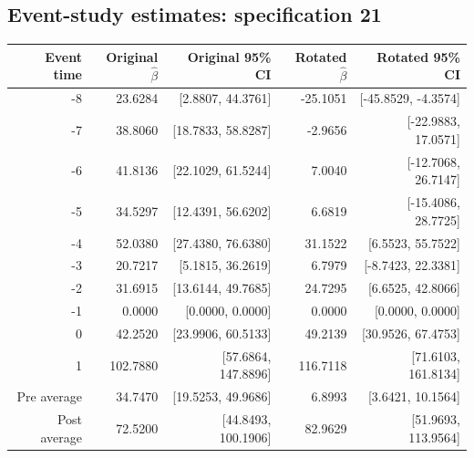 \documentclass[10pt]{article}
\begin{document}
\subsection*{Event-study estimates: specification 21}
\begin{center}\scriptsize
\begin{tabular}{r rr rr}
\toprule
Event time & Original $\hat\beta$ & Original 95\% CI & Rotated $\hat\beta$ & Rotated 95\% CI \\
\midrule
-8 & 23.6284 & [2.8807, 44.3761] & -25.1051 & [-45.8529, -4.3574] \\
-7 & 38.8060 & [18.7833, 58.8287] & -2.9656 & [-22.9883, 17.0571] \\
-6 & 41.8136 & [22.1029, 61.5244] & 7.0040 & [-12.7068, 26.7147] \\
-5 & 34.5297 & [12.4391, 56.6202] & 6.6819 & [-15.4086, 28.7725] \\
-4 & 52.0380 & [27.4380, 76.6380] & 31.1522 & [6.5523, 55.7522] \\
-3 & 20.7217 & [5.1815, 36.2619] & 6.7979 & [-8.7423, 22.3381] \\
-2 & 31.6915 & [13.6144, 49.7685] & 24.7295 & [6.6525, 42.8066] \\
-1 & 0.0000 & [0.0000, 0.0000] & 0.0000 & [0.0000, 0.0000] \\
0 & 42.2520 & [23.9906, 60.5133] & 49.2139 & [30.9526, 67.4753] \\
1 & 102.7880 & [57.6864, 147.8896] & 116.7118 & [71.6103, 161.8134] \\
\midrule
Pre average & 34.7470 & [19.5253, 49.9686] & 6.8993 & [3.6421, 10.1564] \\
Post average & 72.5200 & [44.8493, 100.1906] & 82.9629 & [51.9693, 113.9564] \\
\bottomrule
\end{tabular}
\end{center}
\clearpage
\end{document}
